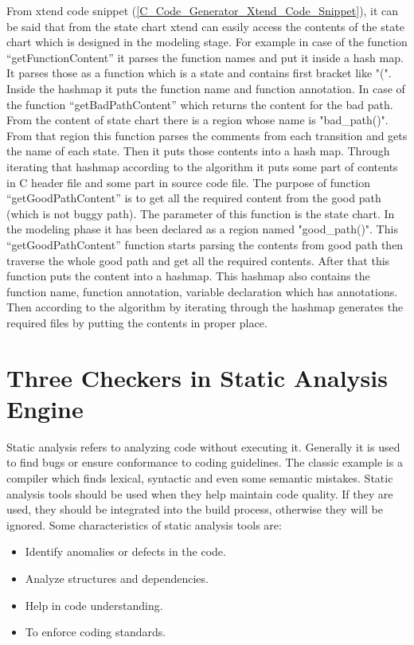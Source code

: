 From xtend code snippet  (\ref{C_Code_Generator_Xtend_Code_Snippet}), it can be said that from the state chart xtend can easily access the contents of the state chart which is designed in the modeling stage. For example in case of the function \enquote{getFunctionContent} it parses the function names and put it inside a hash map. It parses those as a function which is a state and contains first bracket like "(". Inside the hashmap it puts the function name and function annotation. In case of the function \enquote{getBadPathContent} which returns the content for the bad path. From the content of state chart there is a region whose name is "bad\_path()". From that region this function parses the comments from each transition and gets the name of each state. Then it puts those contents into a hash map. Through iterating that hashmap according to the algorithm it puts some part of contents in C header file and some part in source code file. The purpose of function \enquote{getGoodPathContent} is to get all the required content from the good path (which is not buggy path). The parameter of this function is the state chart. In the modeling phase it has been declared as a region named "good\_path()". This \enquote{getGoodPathContent} function starts parsing the contents from good path then traverse the whole good path and get all the required contents. After that this function puts the content into a hashmap. This hashmap also contains the function name, function annotation, variable declaration which has annotations. Then according to the algorithm by iterating through the hashmap generates the required files by putting the contents in proper place. 

\section{Three Checkers in Static Analysis Engine}
Static analysis refers to analyzing code without executing it. Generally it is used to find bugs or ensure conformance to coding guidelines. The classic example is a compiler which finds lexical, syntactic and even some semantic mistakes. Static analysis tools should be used when they help maintain code quality. If they are used, they should be integrated into the build process, otherwise they will be ignored. Some characteristics of static analysis tools are:
\begin{itemize}	
	\item Identify anomalies or defects in the code.
	\item Analyze structures and dependencies.
	\item Help in code understanding.
	\item To enforce coding standards.
\end{itemize}

